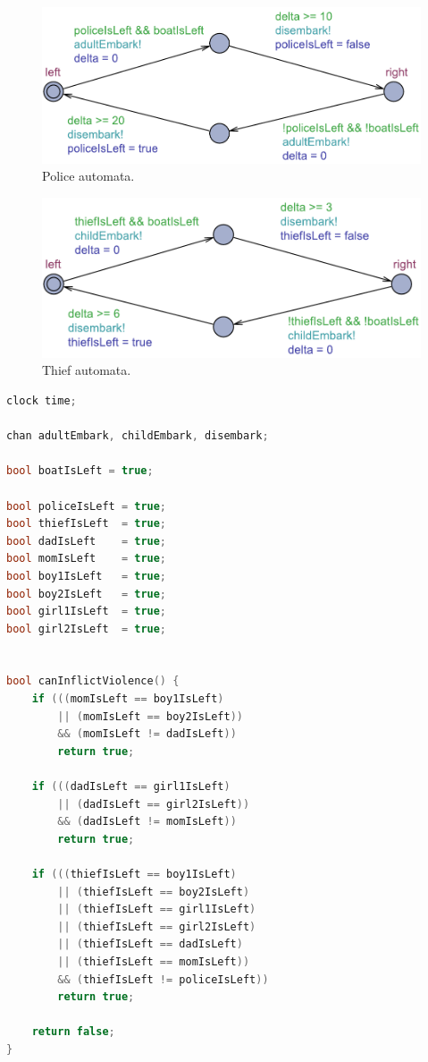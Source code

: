 \documentclass[a4paper,12pt]{scrartcl}
\begin{document}
\begin{figure}[h]
\centering
\includegraphics[width=0.7\linewidth]{Police.pdf}
\caption{Police automata.}
\label{fig:police}
\end{figure}

\begin{figure}[h]
\centering
\includegraphics[width=0.7\linewidth]{Thief.pdf}
\caption{Thief automata.}
\label{fig:thief}
\end{figure}

\begin{lstlisting}[language=CPP, label = lst:plugin_example, caption = Global declaration.]
clock time;

chan adultEmbark, childEmbark, disembark;

bool boatIsLeft = true;

bool policeIsLeft = true;
bool thiefIsLeft  = true;
bool dadIsLeft    = true;
bool momIsLeft    = true;
bool boy1IsLeft   = true;
bool boy2IsLeft   = true;
bool girl1IsLeft  = true;
bool girl2IsLeft  = true;


bool canInflictViolence() {
    if (((momIsLeft == boy1IsLeft)
    	|| (momIsLeft == boy2IsLeft))
    	&& (momIsLeft != dadIsLeft))
        return true;

    if (((dadIsLeft == girl1IsLeft)
    	|| (dadIsLeft == girl2IsLeft))
    	&& (dadIsLeft != momIsLeft))
        return true;

    if (((thiefIsLeft == boy1IsLeft)
    	|| (thiefIsLeft == boy2IsLeft)
    	|| (thiefIsLeft == girl1IsLeft)
    	|| (thiefIsLeft == girl2IsLeft)
    	|| (thiefIsLeft == dadIsLeft)
    	|| (thiefIsLeft == momIsLeft))
    	&& (thiefIsLeft != policeIsLeft))
        return true;

    return false;
}
\end{lstlisting}
\end{document}
